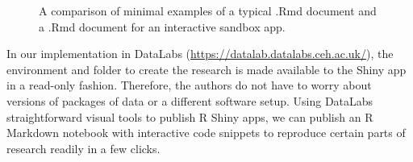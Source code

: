 \begin{Schunk}
\begin{figure}

{\centering {}

}

\caption[A comparison of minimal examples of a typical .Rmd document and a .Rmd document for an interactive sandbox app]{A comparison of minimal examples of a typical .Rmd document and a .Rmd document for an interactive sandbox app.}\label{fig:fig-skeleton}
\end{figure}
\end{Schunk}

In our implementation in DataLabs
(\url{https://datalab.datalabs.ceh.ac.uk/}), the environment and folder
to create the research is made available to the Shiny app in a read-only
fashion. Therefore, the authors do not have to worry about versions of
packages of data or a different software setup. Using DataLabs
straightforward visual tools to publish R Shiny apps, we can publish an
R Markdown notebook with interactive code snippets to reproduce certain
parts of research readily in a few clicks.

